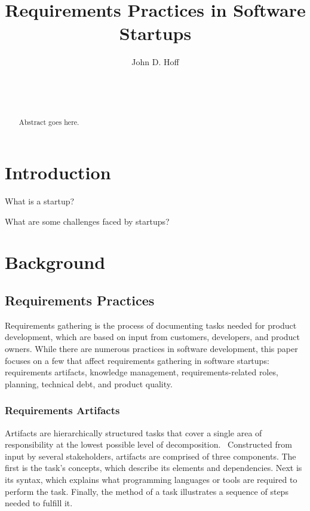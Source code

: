 \documentclass{sig-alternate}
\begin{document}

\title{Requirements Practices in Software Startups}


\author{
\alignauthor
John D. Hoff\\
	\\
	\\
	\\
}

\maketitle
\begin{abstract}
Abstract goes here.

\end{abstract}


\section{Introduction}
\label{sec:introduction}
What is a startup? 

What are some challenges faced by startups?

\section{Background}
\label{sec:background}

\subsection{Requirements Practices}
\label{sec:practices}
Requirements gathering is the process of documenting tasks needed for product development, which are based on input from customers, developers, and product owners. While there are numerous practices in software development, this paper focuses on a few that affect requirements gathering in software startups: requirements artifacts, knowledge management, requirements-related roles, planning, technical debt, and product quality.

\subsubsection{Requirements Artifacts}
Artifacts are hierarchically structured tasks that cover a single area of responsibility at the lowest possible level of decomposition.~\cite{Fernandez:2018} Constructed from input by several stakeholders, artifacts are comprised of three components. The first is the task's concepts, which describe its elements and dependencies. Next is its syntax, which explains what programming languages or tools are required to perform the task. Finally, the method of a task illustrates a sequence of steps needed to fulfill it.~\cite{Fernandez:2018}
\end{document}
